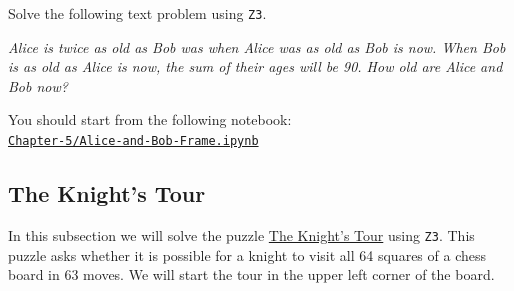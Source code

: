 \exerciseEng
Solve the following text problem using \texttt{Z3}.

\begin{minipage}[b]{0.9\linewidth}
\textsl{Alice is twice as old as Bob was when Alice was as old as Bob is now. When Bob is as old as Alice is now, the sum of their ages will be 90. How old are Alice and Bob now?}
\end{minipage}

\noindent
You should start from the following notebook:
\\[0.2cm]
\hspace*{0.8cm}
\href{https://github.com/karlstroetmann/Logic/blob/master/TypeScript/Chapter-5/Alice-and-Bob-Frame.ipynb}{\texttt{Chapter-5/Alice-and-Bob-Frame.ipynb}}
\eox

\subsection{The Knight's Tour}
In this subsection we will solve the puzzle \href{https://en.wikipedia.org/wiki/Knight%27s_tour}{The Knight's Tour} 
using \texttt{Z3}.  This puzzle asks whether it is possible for a knight to visit all 64 squares of a chess board
in 63 moves.  We will start the tour in the upper left corner of the board.  

